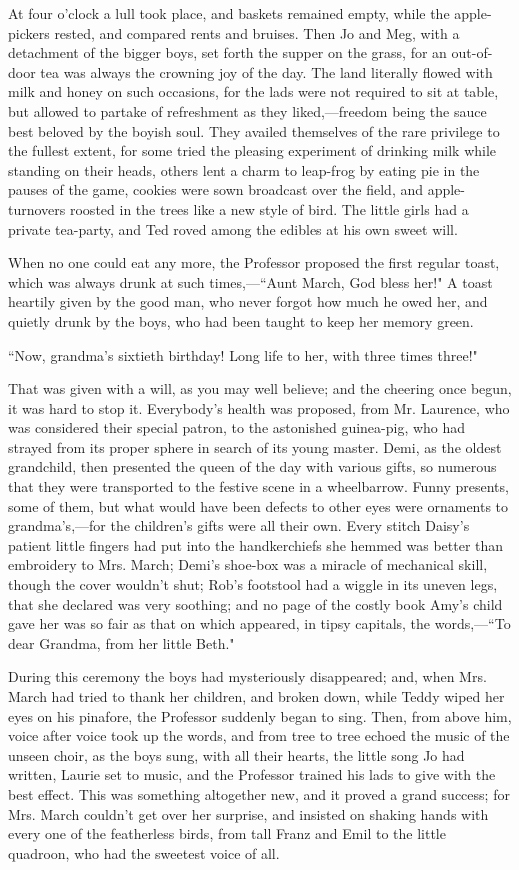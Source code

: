 At four o'clock a lull took place, and baskets remained
empty, while the apple-pickers rested, and compared rents and bruises.
Then Jo and Meg, with a detachment of the bigger boys, set forth the
supper on the grass, for an out-of-door tea was always the crowning joy
of the day. The land literally flowed with milk and honey on such
occasions, for the lads were not required to sit at table, but allowed
to partake of refreshment as they liked,---freedom being the sauce best
beloved by the boyish soul. They availed themselves of the rare
privilege to the fullest extent, for some tried the pleasing experiment
of drinking milk while standing on their heads, others lent a charm to
leap-frog by eating pie in the pauses of the game, cookies were sown
broadcast over the field, and apple-turnovers roosted in the trees like
a new style of bird. The little girls had a private tea-party, and Ted
roved among the edibles at his own sweet will.

When no one could eat any more, the Professor proposed the first regular
toast, which was always drunk at such times,---``Aunt March, God bless
her!" A toast heartily given by the good man, who never forgot how much
he owed her, and quietly drunk by the boys, who had been taught to keep
her memory green.

``Now, grandma's sixtieth birthday! Long life to her,
with three times three!"

That was given with a will, as you may well believe; and the cheering
once begun, it was hard to stop it. Everybody's health
was proposed, from Mr. Laurence, who was considered their special
patron, to the astonished guinea-pig, who had strayed from its proper
sphere in search of its young master. Demi, as the oldest grandchild,
then presented the queen of the day with various gifts, so numerous that
they were transported to the festive scene in a wheelbarrow. Funny
presents, some of them, but what would have been defects to other eyes
were ornaments to grandma's,---for the
children's gifts were all their own. Every stitch
Daisy's patient little fingers had put into the
handkerchiefs she hemmed was better than embroidery to Mrs. March;
Demi's shoe-box was a miracle of mechanical skill,
though the cover wouldn't shut; Rob's
footstool had a wiggle in its uneven legs, that she declared was very
soothing; and no page of the costly book Amy's child
gave her was so fair as that on which appeared, in tipsy capitals, the
words,---``To dear Grandma, from her little Beth."

During this ceremony the boys had mysteriously disappeared; and, when
Mrs. March had tried to thank her children, and broken down, while Teddy
wiped her eyes on his pinafore, the Professor suddenly began to sing.
Then, from above him, voice after voice took up the words, and from tree
to tree echoed the music of the unseen choir, as the boys sung, with all
their hearts, the little song Jo had written, Laurie set to music, and
the Professor trained his lads to give with the best effect. This was
something altogether new, and it proved a grand success; for Mrs. March
couldn't get over her surprise, and insisted on shaking
hands with every one of the featherless birds, from tall Franz and Emil
to the little quadroon, who had the sweetest voice of all.

